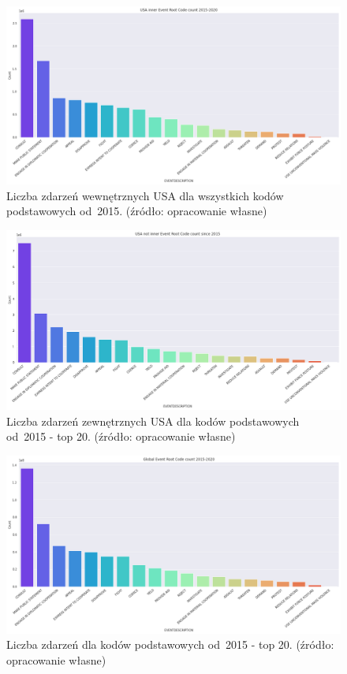 \documentclass[11pt]{report}
\begin{document}
    \begin{figure}[tp]
        \centering
        \includegraphics[width=\linewidth]{fig/USA inner/ERC.png}
        \caption{Liczba zdarzeń wewnętrznych USA dla wszystkich kodów podstawowych od~2015. (źródło: opracowanie własne)}
        \label{fig:USA_inner_ERC}
    \end{figure}

    \begin{figure}[tp]
        \centering
        \includegraphics[width=\linewidth]{fig/USA not inner/ERC.png}
        \caption{Liczba zdarzeń zewnętrznych USA dla kodów podstawowych od~2015 - top 20. (źródło: opracowanie własne)}
        \label{fig:USA_not_inner_ERC}
    \end{figure}

    \begin{figure}[tp]
        \centering
        \includegraphics[width=\linewidth]{fig/GLOBAL//ERC.png}
        \caption{Liczba zdarzeń dla kodów podstawowych od~2015 - top 20. (źródło: opracowanie własne)}
        \label{fig:GLOBAL_ERC}
    \end{figure}
\end{document}
